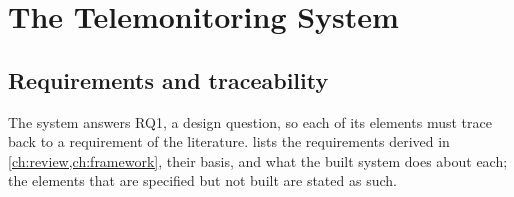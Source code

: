\section{The Telemonitoring System}\label{sec:system}\label{sec:backend}\label{sec:interfaces}

\subsection{Requirements and traceability}\label{sec:design-req}\label{sec:traceability}

The system answers RQ1, a design question, so each of its elements must trace back to a requirement of the literature.  lists the requirements derived in \cref{ch:review,ch:framework}, their basis, and what the built system does about each; the elements that are specified but not built are stated as such.

